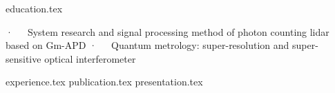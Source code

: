 \documentclass[11pt, a4paper]{awesome-cv}
\newcommand*{\sectiondir}{resume/}
\begin{document}
\makecvheader[R]

{education.tex}

\begin{cventries}
\cventry
    {}
    {·~~~System research and signal processing method of photon counting lidar based on Gm-APD}
    {}
    {}
    {}
  \cventry
    {}
    {·~~~Quantum metrology: super-resolution and super-sensitive optical interferometer}
    {}
    {}
    {}
\end{cventries}

{experience.tex}
{publication.tex}
{presentation.tex}

\begin{cvskills}
\end{cvskills}
\end{document}
